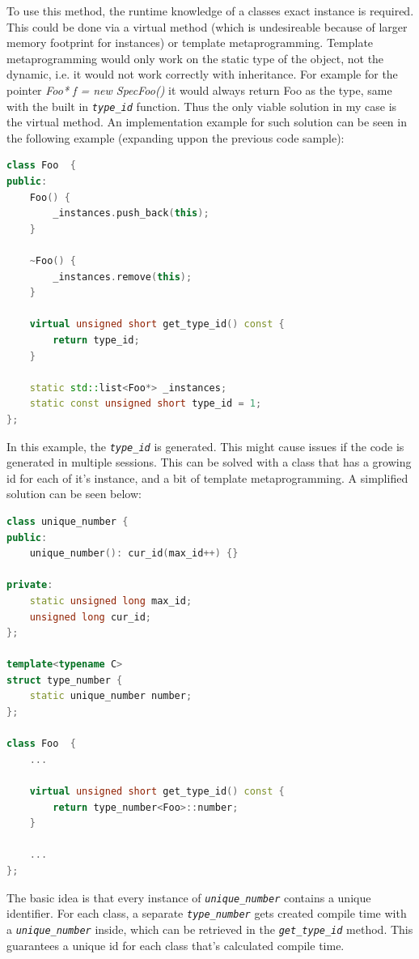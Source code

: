 To use this method, the runtime knowledge of a classes exact instance is
required. This could be done via a virtual method (which is undesireable
because of larger memory footprint for instances) or template metaprogramming.
Template metaprogramming would only work on the static type of the object, not
the dynamic, i.e. it would not work correctly with inheritance. For example for
the pointer \emph{Foo* f = new SpecFoo()} it would always return Foo as the
type, same with the built in \emph{\texttt{type\_id}} function. Thus the only
viable solution in my case is the virtual method. An implementation example for
such solution can be seen in the following example (expanding uppon the
previous code sample):

\begin{lstlisting}[frame=single,language=C++, label=listing:type_id,
caption=Type identifier for classes.]
class Foo  {
public:
	Foo() {
		_instances.push_back(this);
	}
	
	~Foo() {
		_instances.remove(this);
	}
	
	virtual unsigned short get_type_id() const {
        return type_id;
    }
		
	static std::list<Foo*> _instances;
	static const unsigned short type_id = 1;
};
\end{lstlisting}

In this example, the \emph{\texttt{type\_id}} is generated. This might cause
issues if the code is generated in multiple sessions. This can be solved with a
class that has a growing id for each of it's instance, and a bit of template
metaprogramming. A simplified solution can be seen below:

\begin{lstlisting}[frame=single,float=!ht,language=C++,
label=listing:unique_number, caption=Unique number generation for type
identifiers.]
class unique_number { 
public:
	unique_number(): cur_id(max_id++) {}

private:
	static unsigned long max_id;
	unsigned long cur_id;
};

template<typename C>
struct type_number {
	static unique_number number;
};

class Foo  {
	...
	
	virtual unsigned short get_type_id() const {
        return type_number<Foo>::number;
    }
    
	...
};
\end{lstlisting}

The basic idea is that every instance of \emph{\texttt{unique\_number}} contains
a unique identifier. For each class, a separate \emph{\texttt{type\_number}}
gets created compile time with a \emph{\texttt{unique\_number}} inside, which can be
retrieved in the \emph{\texttt{get\_type\_id}} method. This guarantees a unique
id for each class that's calculated compile time.

